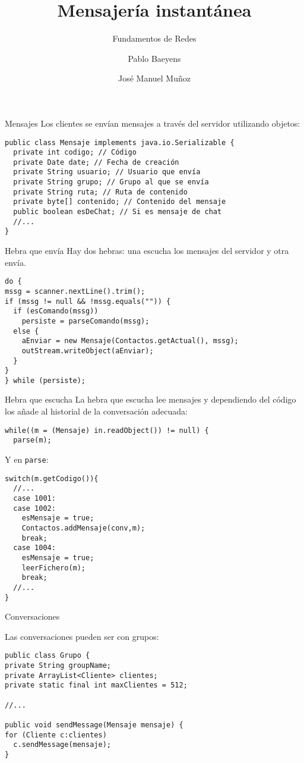 \documentclass[compress]{beamer}
\title{Mensajería instantánea}
\subtitle{Fundamentos de Redes}
\author{Pablo Baeyens \and José Manuel Muñoz}
\date{}
\begin{document}
\begin{frame}
\titlepage
\end{frame}

\begin{frame}[fragile]{Mensajes}
  Los clientes se envían mensajes a través del servidor utilizando objetos:

\begin{lstlisting}
public class Mensaje implements java.io.Serializable {
  private int codigo; // Código
  private Date date; // Fecha de creación
  private String usuario; // Usuario que envía
  private String grupo; // Grupo al que se envía
  private String ruta; // Ruta de contenido
  private byte[] contenido; // Contenido del mensaje
  public boolean esDeChat; // Si es mensaje de chat
  //...
}
\end{lstlisting}
\end{frame}

\begin{frame}[fragile]{Hebra que envía}
  Hay dos hebras: una escucha los mensajes del servidor y otra envía.
\begin{lstlisting}
do {
mssg = scanner.nextLine().trim();
if (mssg != null && !mssg.equals("")) {
  if (esComando(mssg))
    persiste = parseComando(mssg);
  else {
    aEnviar = new Mensaje(Contactos.getActual(), mssg);
    outStream.writeObject(aEnviar);
  }
}
} while (persiste);
\end{lstlisting}
\end{frame}

\begin{frame}[fragile]{Hebra que escucha}
  La hebra que escucha lee mensajes y dependiendo del código los añade al historial de la conversación adecuada:
\begin{lstlisting}
while((m = (Mensaje) in.readObject()) != null) {
  parse(m);
\end{lstlisting}

Y en \texttt{parse}:

\begin{lstlisting}
switch(m.getCodigo()){
  //...
  case 1001:
  case 1002:
    esMensaje = true;
    Contactos.addMensaje(conv,m);
    break;
  case 1004:
    esMensaje = true;
    leerFichero(m);
    break;
  //...
}
\end{lstlisting}
\end{frame}

\begin{frame}[fragile]{Conversaciones}

  Las conversaciones pueden ser con grupos:
\begin{lstlisting}
public class Grupo {
private String groupName;
private ArrayList<Cliente> clientes;
private static final int maxClientes = 512;

//...

public void sendMessage(Mensaje mensaje) {
for (Cliente c:clientes)
  c.sendMessage(mensaje);
}
\end{lstlisting}
\end{frame}
\end{document}
